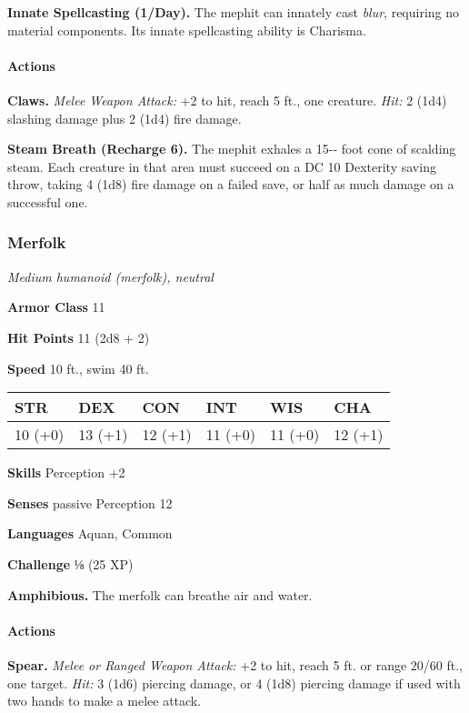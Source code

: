 \documentclass[
]{article}
\begin{document}
\textbf{Innate Spellcasting (1/Day).} The mephit can innately cast
\emph{blur}, requiring no material components. Its innate spellcasting
ability is Charisma.

\hypertarget{actions-6}{%
\paragraph{Actions}\label{actions-6}}

\textbf{Claws.} \emph{Melee Weapon Attack:} +2 to hit, reach 5 ft., one
creature. \emph{Hit:} 2 (1d4) slashing damage plus 2 (1d4) fire damage.

\textbf{Steam Breath (Recharge 6).} The mephit exhales a 15-­‐ foot cone
of scalding steam. Each creature in that area must succeed on a DC 10
Dexterity saving throw, taking 4 (1d8) fire damage on a failed save, or
half as much damage on a successful one.

\hypertarget{merfolk}{%
\subsubsection{Merfolk}\label{merfolk}}

\emph{Medium humanoid (merfolk), neutral}

\textbf{Armor Class} 11

\textbf{Hit Points} 11 (2d8 + 2)

\textbf{Speed} 10 ft., swim 40 ft.

\begin{longtable}[]{@{}llllll@{}}
\toprule
STR & DEX & CON & INT & WIS & CHA\tabularnewline
\midrule
\endhead
10 (+0) & 13 (+1) & 12 (+1) & 11 (+0) & 11 (+0) & 12 (+1)\tabularnewline
\bottomrule
\end{longtable}

\textbf{Skills} Perception +2

\textbf{Senses} passive Perception 12

\textbf{Languages} Aquan, Common

\textbf{Challenge} ⅛ (25 XP)

\textbf{Amphibious.} The merfolk can breathe air and water.

\hypertarget{actions-7}{%
\paragraph{Actions}\label{actions-7}}

\textbf{Spear.} \emph{Melee or Ranged Weapon Attack:} +2 to hit, reach 5
ft. or range 20/60 ft., one target. \emph{Hit:} 3 (1d6) piercing damage,
or 4 (1d8) piercing damage if used with two hands to make a melee
attack.
\end{document}
